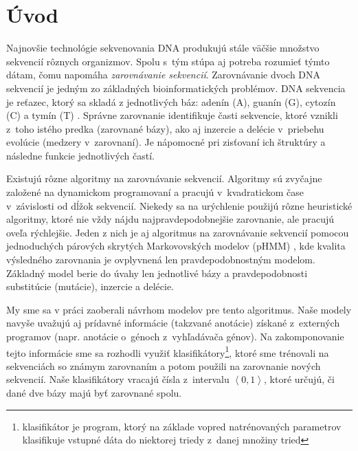 \chapter*{Úvod}
{}

Najnovšie technológie sekvenovania DNA produkujú stále väčšie množstvo sekvencií rôznych organizmov. Spolu s~tým stúpa aj potreba rozumieť týmto dátam, čomu napomáha \textit{zarovnávanie sekvencií}.
Zarovnávanie dvoch DNA sekvencií je jedným zo základných
bioinformatických problémov.
DNA sekvencia je reťazec, ktorý sa skladá z jednotlivých báz: adenín (A), guanín (G), cytozín (C) a tymín (T) \cite{wiki:dna}.
Správne zarovnanie identifikuje časti
sekvencie, ktoré vznikli z~toho istého predka (zarovnané bázy), ako aj
inzercie a delécie v~priebehu evolúcie (medzery v~zarovnaní).
Je nápomocné pri zisťovaní ich štruktúry a následne funkcie jednotlivých častí.

Existujú rôzne algoritmy na zarovnávanie sekvencií.
Algoritmy sú zvyčajne založené na dynamickom programovaní a pracujú v~kvadratickom čase v~závislosti od dĺžok sekvencií. Niekedy sa na urýchlenie použijú rôzne heuristické algoritmy, ktoré nie vždy nájdu najpravdepodobnejšie zarovnanie, ale pracujú oveľa rýchlejšie. Jeden z nich je aj algoritmus na zarovnávanie sekvencií pomocou jednoduchých párových skrytých Markovovských modelov (pHMM) \cite{durbin}, kde kvalita výsledného zarovnania je ovplyvnená len pravdepodobnostným modelom.
Základný model berie do úvahy len jednotlivé bázy a pravdepodobnosti substitúcie (mutácie), inzercie a delécie.

My sme sa v práci zaoberali návrhom modelov pre tento algoritmus. Naše modely navyše uvažujú aj prídavné informácie (takzvané anotácie) získané z~externých programov (napr. anotácie o~génoch z~vyhľadávača génov). Na zakomponovanie tejto informácie sme sa rozhodli využiť klasifikátory\footnote{klasifikátor je program, ktorý na základe vopred natrénovaných parametrov klasifikuje vstupné dáta do niektorej triedy z~danej množiny tried}, ktoré  sme trénovali na sekvenciách so známym zarovnaním a potom použili na zarovnanie nových sekvencií. Naše klasifikátory vracajú čísla z~intervalu $\left<0, 1\right>$, ktoré určujú, či dané dve bázy majú byť zarovnané spolu.


